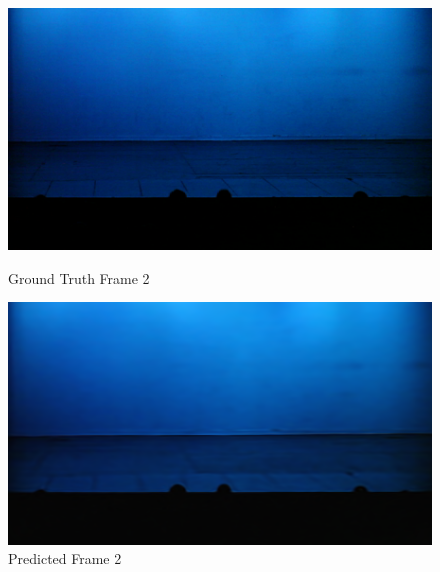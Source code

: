 \documentclass{ioereport}
\begin{document}
    \begin{figure}[H]
    \centering
    \begin{minipage}{0.45\textwidth}
        \centering
        \includegraphics[width=\linewidth]{assets/video_results/im2.png}
        \caption{Ground Truth Frame 2}
        \label{fig:gt-frame-2}
    \end{minipage}\hfill
    \begin{minipage}{0.45\textwidth}
        \centering
        \includegraphics[width=\linewidth]{assets/video_results/pred1.png}
        \caption{Predicted Frame 2}
        \label{fig:pred-frame-2}
    \end{minipage}
\end{figure}
\end{document}
